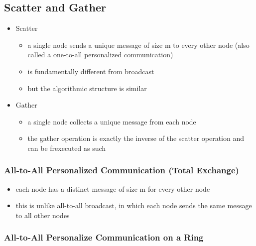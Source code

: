 \hypertarget{scatter-and-gather}{%
\subsection{Scatter and Gather}\label{scatter-and-gather}}

\begin{itemize}
\tightlist
\item
  Scatter

  \begin{itemize}
  \tightlist
  \item
    a single node sends a unique message of size m to every other node
    (also called a one-to-all personalized communication)
  \item
    is fundamentally different from broadcast
  \item
    but the algorithmic structure is similar
  \end{itemize}
\item
  Gather

  \begin{itemize}
  \tightlist
  \item
    a single node collects a unique message from each node
  \item
    the gather operation is exactly the inverse of the scatter operation
    and can be frexecuted as such
  \end{itemize}
\end{itemize}

\hypertarget{all-to-all-personalized-communication-total-exchange}{%
\subsubsection{All-to-All Personalized Communication (Total
Exchange)}\label{all-to-all-personalized-communication-total-exchange}}

\begin{itemize}
\tightlist
\item
  each node has a distinct message of size m for every other node
\item
  this is unlike all-to-all broadcast, in which each node sends the same
  message to all other nodes
\end{itemize}

\clearpage
\hypertarget{all-to-all-personalize-communication-on-a-ring}{%
\subsubsection{All-to-All Personalize Communication on a
Ring}\label{all-to-all-personalize-communication-on-a-ring}}

